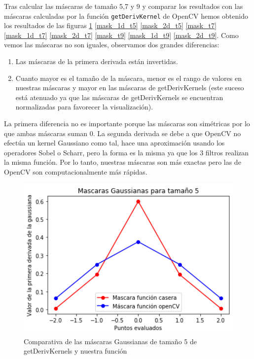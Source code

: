 \documentclass[12pt,spanish]{article}
\begin{document}
Tras calcular las máscaras de tamaño 5,7 y 9 y comparar los resultados con las máscaras calculadas por la función \texttt{getDerivKernel} de OpenCV hemos obtenido los resultados de las figuras \ref{mask_t5} \ref{mask_1d_t5} \ref{mask_2d_t5} \ref{mask_t7} \ref{mask_1d_t7} \ref{mask_2d_t7} \ref{mask_t9} \ref{mask_1d_t9} \ref{mask_2d_t9}. Como vemos las máscaras no son iguales, observamos dos grandes diferencias:

\begin{enumerate}
	\item Las máscaras de la primera derivada están invertidas.
	\item Cuanto mayor es el tamaño de la máscara, menor es el rango de valores en nuestras máscaras y mayor en las máscaras de getDerivKernels (este suceso está atenuado ya que las máscaras de getDerivKernels se encuentran normalizadas para favorecer la visualización).
\end{enumerate}

La primera diferencia no es importante porque las máscaras son simétricas por lo que ambas máscaras suman 0. La segunda derivada se debe a que OpenCV no efectúa un kernel Gaussiano como tal, hace una aproximación usando los operadores Sobel o Scharr, pero la forma es la misma ya que los 3 filtros realizan la misma función. Por lo tanto, nuestras máscaras son más exactas pero las de OpenCV son computacionalmente más rápidas.

\begin{figure}[H]
	\centering
	\includegraphics[width=12cm, scale=1]{./imagenes_memoria/1_t5.png}
	\caption{Comparativa de las máscaras Gaussianas de tamaño 5 de getDerivKernels y nuestra función}
	\label{mask_t5}
\end{figure}
\end{document}
